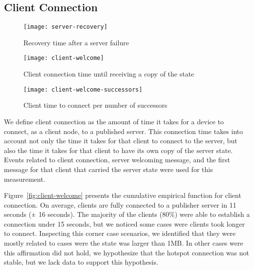 \subsection{Client Connection}
\label{sub:eval:connection}


\begin{figure*}
        \centering
        \texttt{[image: server-recovery]}
        \caption{Recovery time after a server failure}\label{fig:server-recovery}%
    \endminipage\hfill
        \centering
        \texttt{[image: client-welcome]}
        \caption{Client connection time until receiving a copy of the state}\label{fig:client-welcome}%
    \endminipage\hfill
        \centering
        \texttt{[image: client-welcome-successors]}
        \caption{Client time to connect per number of successors}\label{fig:client-welcome-successors}%
    \endminipage\hfill
\end{figure*}

We define client connection as the amount of time it takes for a device to connect, as a client node, to a published server.
This connection time takes into account not only the time it takes for that client to connect to the server, 
but also the time it takes for that client to have its own copy of the server state. 
Events related to client connection, server welcoming message, and the first message for that client that carried the server state were used for this measurement.


Figure~\ref{fig:client-welcome} presents the cumulative empirical function for client connection.
On average, clients are fully connected to a publisher server in 11 seconds ($\rpm$ 16 seconds). 
The majority of the clients (80\%) were able to establish a connection under 15 seconds, 
but we noticed some cases were clients took longer to connect. 
Inspecting this corner case scenarios, we identified that they were mostly related to cases were the state was larger than 1MB.
In other cases were this affirmation did not hold, we hypothesize that the hotspot connection was not stable, but we lack data to support this hypothesis.


